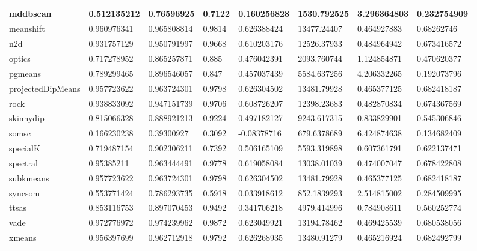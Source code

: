 \begin{table}[H]
\begin{tabular}{|l|l|l|l|l|l|l|l|}
\hline
mddbscan & 0.512135212 & 0.76596925 & 0.7122 & 0.160256828 & 1530.792525 & 3.296364803 & 0.232754909 \\
\hline
meanshift & 0.960976341 & 0.965808814 & 0.9814 & 0.626388424 & 13477.24407 & 0.464927883 & 0.68262746 \\
\hline
n2d & 0.931757129 & 0.950791997 & 0.9668 & 0.610203176 & 12526.37933 & 0.484964942 & 0.673416572 \\
\hline
optics & 0.717278952 & 0.865257871 & 0.885 & 0.476042391 & 2093.760744 & 1.124854871 & 0.470620377 \\
\hline
pgmeans & 0.789299465 & 0.896546057 & 0.847 & 0.457037439 & 5584.637256 & 4.206332265 & 0.192073796 \\
\hline
projectedDipMeans & 0.957723622 & 0.963724301 & 0.9798 & 0.626304502 & 13481.79928 & 0.465377125 & 0.682418187 \\
\hline
rock & 0.938833092 & 0.947151739 & 0.9706 & 0.608726207 & 12398.23683 & 0.482870834 & 0.674367569 \\
\hline
skinnydip & 0.815066328 & 0.888921213 & 0.9224 & 0.497182127 & 9243.617315 & 0.833829901 & 0.545306846 \\
\hline
somsc & 0.166230238 & 0.39300927 & 0.3092 & -0.08378716 & 679.6378689 & 6.424874638 & 0.134682409 \\
\hline
specialK & 0.719487154 & 0.902306211 & 0.7392 & 0.506165109 & 5593.319898 & 0.607361791 & 0.622137471 \\
\hline
spectral & 0.95385211 & 0.963444491 & 0.9778 & 0.619058084 & 13038.01039 & 0.474007047 & 0.678422808 \\
\hline
subkmeans & 0.957723622 & 0.963724301 & 0.9798 & 0.626304502 & 13481.79928 & 0.465377125 & 0.682418187 \\
\hline
syncsom & 0.553771424 & 0.786293735 & 0.5918 & 0.033918612 & 852.1839293 & 2.514815002 & 0.284509995 \\
\hline
ttsas & 0.853116753 & 0.897070453 & 0.9492 & 0.341706218 & 4979.414996 & 0.784908611 & 0.560252774 \\
\hline
vade & 0.972776972 & 0.974239962 & 0.9872 & 0.623049921 & 13194.78462 & 0.469425539 & 0.680538056 \\
\hline
xmeans & 0.956397699 & 0.962712918 & 0.9792 & 0.626268935 & 13480.91279 & 0.465216924 & 0.682492799 \\
\hline
\end{tabular}
\end{table}